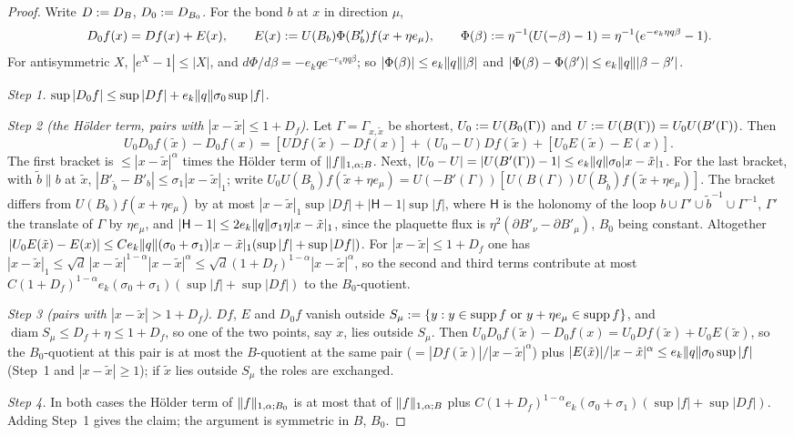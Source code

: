 \begin{proof}
Write $D:= D_B$, $D_0:= D_{B_0}$. For the bond $b$ at $x$ in direction $\mu$,
\[
D_0f(x)=Df(x)+E(x),\qquad E(x):= U(B_b)\Phi(B'_b)f(x+\eta e_\mu),\qquad \Phi(\beta):=\eta^{-1}(U(-\beta)-1)=\eta^{-1}(e^{-e_k\eta q\beta}-1).
\]
For antisymmetric $X$, $|e^X-1|\le|X|$, and $d\Phi/d\beta=-e_kqe^{-e_k\eta q\beta}$; so $|\Phi(\beta)|\le e_k\lVert q\rVert|\beta|$ and $|\Phi(\beta)-\Phi(\beta')|\le e_k\lVert q\rVert|\beta-\beta'|$.

\emph{Step 1.} $\sup|D_0f|\le\sup|Df|+e_k\lVert q\rVert\sigma_0\sup|f|$.

\emph{Step 2 (the H\"older term, pairs with $|x-\tilde x|\le1+D_f$).} Let $\Gamma=\Gamma_{x,\tilde x}$ be shortest, $U_0:= U(B_0(\Gamma))$ and $U:= U(B(\Gamma))=U_0U(B'(\Gamma))$. Then
\[
U_0D_0f(\tilde x)-D_0f(x)=[UDf(\tilde x)-Df(x)]+(U_0-U)Df(\tilde x)+[U_0E(\tilde x)-E(x)].
\]
The first bracket is $\le|x-\tilde x|^\alpha$ times the H\"older term of $\lVert f\rVert_{1,\alpha;B}$. Next, $|U_0-U|=|U(B'(\Gamma))-1|\le e_k\lVert q\rVert\sigma_0|x-\tilde x|_1$. For the last bracket, with $\tilde b\parallel b$ at $\tilde x$, $|B'_{\tilde b}-B'_b|\le\sigma_1|x-\tilde x|_1$; write $U_0U(B_{\tilde b})f(\tilde x+\eta e_\mu)=U(-B'(\Gamma))[U(B(\Gamma))U(B_{\tilde b})f(\tilde x+\eta e_\mu)]$. The bracket differs from $U(B_b)f(x+\eta e_\mu)$ by at most $|x-\tilde x|_1\sup|Df|+|\mathsf H-1|\sup|f|$, where $\mathsf H$ is the holonomy of the loop $b\cup\Gamma'\cup\tilde b^{-1}\cup\Gamma^{-1}$, $\Gamma'$ the translate of $\Gamma$ by $\eta e_\mu$, and $|\mathsf H-1|\le2e_k\lVert q\rVert\sigma_1\eta|x-\tilde x|_1$, since the plaquette flux is $\eta^2(\partial B'_\nu-\partial B'_\mu)$, $B_0$ being constant. Altogether $|U_0E(\tilde x)-E(x)|\le Ce_k\lVert q\rVert(\sigma_0+\sigma_1)|x-\tilde x|_1(\sup|f|+\sup|Df|)$. For $|x-\tilde x|\le1+D_f$ one has $|x-\tilde x|_1\le\sqrt d\,|x-\tilde x|^{1-\alpha}|x-\tilde x|^\alpha\le\sqrt d(1+D_f)^{1-\alpha}|x-\tilde x|^\alpha$, so the second and third terms contribute at most $C(1+D_f)^{1-\alpha}e_k(\sigma_0+\sigma_1)(\sup|f|+\sup|Df|)$ to the $B_0$-quotient.

\emph{Step 3 (pairs with $|x-\tilde x|>1+D_f$).} $Df$, $E$ and $D_0f$ vanish outside $S_\mu:=\{y:y\in\operatorname{supp} f\text{ or }y+\eta e_\mu\in\operatorname{supp} f\}$, and $\operatorname{diam}S_\mu\le D_f+\eta\le1+D_f$, so one of the two points, say $x$, lies outside $S_\mu$. Then $U_0D_0f(\tilde x)-D_0f(x)=U_0Df(\tilde x)+U_0E(\tilde x)$, so the $B_0$-quotient at this pair is at most the $B$-quotient at the same pair ($=|Df(\tilde x)|/|x-\tilde x|^\alpha$) plus $|E(\tilde x)|/|x-\tilde x|^\alpha\le e_k\lVert q\rVert\sigma_0\sup|f|$ (Step~1 and $|x-\tilde x|\ge1$); if $\tilde x$ lies outside $S_\mu$ the roles are exchanged.

\emph{Step 4.} In both cases the H\"older term of $\lVert f\rVert_{1,\alpha;B_0}$ is at most that of $\lVert f\rVert_{1,\alpha;B}$ plus $C(1+D_f)^{1-\alpha}e_k(\sigma_0+\sigma_1)(\sup|f|+\sup|Df|)$. Adding Step~1 gives the claim; the argument is symmetric in $B$, $B_0$.
\end{proof}


